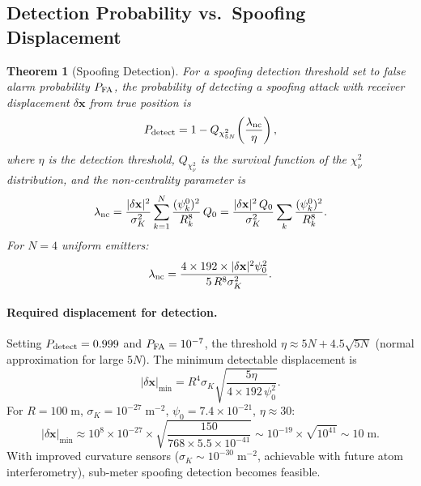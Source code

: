 \documentclass[twocolumn,superscriptaddress,prd,nofootinbib]{revtex4-2}
\newcommand{\xvec}{\mathbf{x}}
\newtheorem{theorem}{Theorem}
\begin{document}
\subsection{Detection Probability vs.\ Spoofing Displacement}

\begin{theorem}[Spoofing Detection]\label{thm:detection}
For a spoofing detection threshold set to false alarm probability
$P_{\rm FA}$, the probability of detecting a spoofing attack with
receiver displacement $\delta\xvec$ from true position is
\begin{equation}
P_{\rm detect} = 1 - Q_{\chi^2_{5N}}\!\left(
\frac{\lambda_{\rm nc}}{\eta}\right),
\label{eq:detect}
\end{equation}
where $\eta$ is the detection threshold,
$Q_{\chi^2_\nu}$ is the survival function of the $\chi^2_\nu$
distribution, and the non-centrality parameter is
\begin{equation}
\lambda_{\rm nc} = \frac{|\delta\xvec|^2}{\sigma_K^2}
\sum_{k=1}^N \frac{(\psi_k^0)^2}{R_k^8}\,Q_0
= \frac{|\delta\xvec|^2\,Q_0}{\sigma_K^2}
\sum_k\frac{(\psi_k^0)^2}{R_k^8}.
\label{eq:nc-param}
\end{equation}
For $N = 4$ uniform emitters:
\begin{equation}
\lambda_{\rm nc} = \frac{4\times 192\times|\delta\xvec|^2\psi_0^2}
{5\,R^8\sigma_K^2}.
\end{equation}
\end{theorem}

\paragraph{Required displacement for detection.}
Setting $P_{\rm detect} = 0.999$ and $P_{\rm FA} = 10^{-7}$, the
threshold $\eta \approx 5N + 4.5\sqrt{5N}$ (normal approximation for
large $5N$). The minimum detectable displacement is
\begin{equation}
|\delta\xvec|_{\min} = R^4\sigma_K\sqrt{\frac{5\eta}{4\times 192\,\psi_0^2}}.
\end{equation}
For $R = 100\;\text{m}$, $\sigma_K = 10^{-27}\;\text{m}^{-2}$,
$\psi_0 = 7.4\times 10^{-21}$, $\eta \approx 30$:
\begin{equation}
|\delta\xvec|_{\min} \approx 10^8\times 10^{-27}
\times\sqrt{\frac{150}{768\times 5.5\times 10^{-41}}}
\sim 10^{-19}\times\sqrt{10^{41}} \sim 10\;\text{m}.
\end{equation}
With improved curvature sensors ($\sigma_K \sim 10^{-30}\;\text{m}^{-2}$,
achievable with future atom interferometry), sub-meter spoofing
detection becomes feasible.
\end{document}
